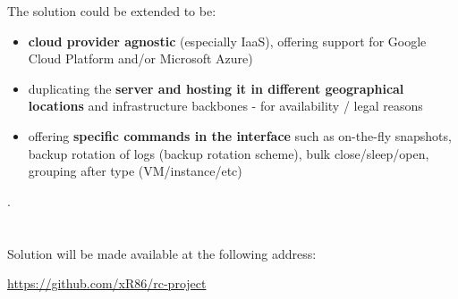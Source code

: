 \documentclass{llncs}
\begin{document}
The solution could be extended to be: 

\begin{itemize}
  \item \textbf{cloud provider agnostic} (especially IaaS), offering support for Google Cloud Platform and/or Microsoft Azure)
  \item duplicating the \textbf{server and hosting it in different geographical locations} and infrastructure backbones - for availability / legal reasons
  \item offering \textbf{specific commands in the interface} such as on-the-fly snapshots, backup rotation of logs (backup rotation scheme), bulk close/sleep/open, grouping after type (VM/instance/etc)
\end{itemize}

.
%
\\
\\
\\
Solution will be made available at the following address:
 \begin{center}\url{https://github.com/xR86/rc-project}\end{center}
\end{document}
